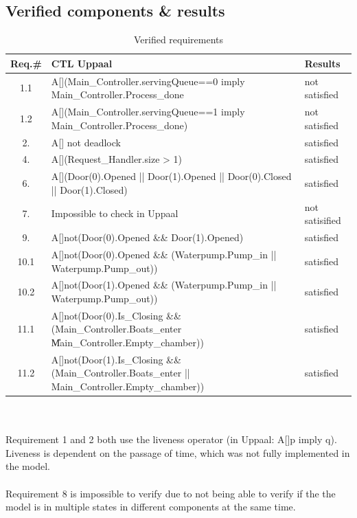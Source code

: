 \documentclass{article}
\begin{document}
    \subsection{Verified components \& results} 
    \begin{table}[h]
            \centering
            \begin{tabular}{|c|p{8cm}|p{2cm}|}
                \hline
              \textbf{Req.\#}  & \textbf{CTL Uppaal} & \textbf{Results}\\
              \hline
              1.1& A[](Main\_Controller.servingQueue==0 imply  Main\_Controller.Process\_done  & not satisfied\\
              \hline
              1.2 & A[](Main\_Controller.servingQueue==1 imply  Main\_Controller.Process\_done) & not satisfied \\
              \hline
              2. & A[] not deadlock & satisfied \\
              \hline
              4. & A[](Request\_Handler.size > 1) & satisfied \\
              \hline
              6. & A[](Door(0).Opened || Door(1).Opened || Door(0).Closed  || Door(1).Closed) & satisfied \\
              \hline
              7. & Impossible to check in Uppaal & not satisified \\
              \hline
              9. & A[]not(Door(0).Opened \&\& Door(1).Opened) & satisfied \\
              \hline
              10.1 & A[]not(Door(0).Opened \&\& (Waterpump.Pump\_in || Waterpump.Pump\_out)) & satisfied \\
              \hline
              10.2 & A[]not(Door(1).Opened \&\& (Waterpump.Pump\_in || Waterpump.Pump\_out)) & satisfied \\
              \hline
              11.1 & A[]not(Door(0).Is\_Closing \&\& (Main\_Controller.Boats\_enter \|\| Main\_Controller.Empty\_chamber)) & satisfied \\
              \hline
              11.2 & A[]not(Door(1).Is\_Closing \&\& (Main\_Controller.Boats\_enter || Main\_Controller.Empty\_chamber)) & satisfied \\ 
              \hline
            \end{tabular}
            \caption{Verified requirements}
            \label{tab:verif}
        \end{table}\\\\
        Requirement 1 and 2 both use the liveness operator (in Uppaal: A[]p imply q). Liveness is dependent on the passage of time, which was not fully implemented in the model. \\\\
        Requirement 8 is impossible to verify due to not being able to verify if the the model is in multiple states in different components at the same time.
        
\end{document}
